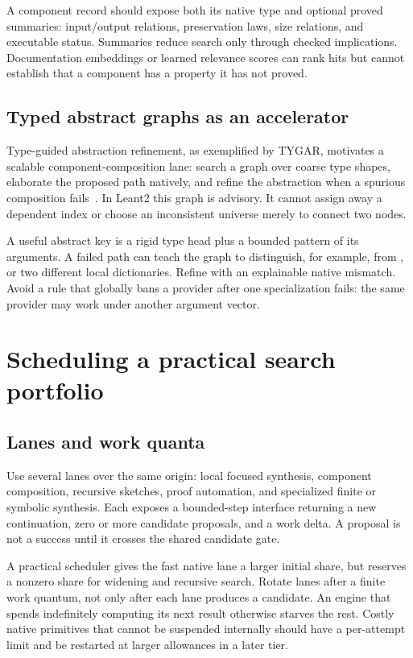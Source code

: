 A component record should expose both its native type and optional proved summaries: input/output relations, preservation laws, size relations, and executable status. Summaries reduce search only through checked implications. Documentation embeddings or learned relevance scores can rank hits but cannot establish that a component has a property it has not proved.

\subsection{Typed abstract graphs as an accelerator}

Type-guided abstraction refinement, as exemplified by TYGAR, motivates a scalable component-composition lane: search a graph over coarse type shapes, elaborate the proposed path natively, and refine the abstraction when a spurious composition fails~\cite{tygar}. In Leant2 this graph is advisory. It cannot assign away a dependent index or choose an inconsistent universe merely to connect two nodes.

A useful abstract key is a rigid type head plus a bounded pattern of its arguments. A failed path can teach the graph to distinguish, for example,  from , or two different local dictionaries. Refine with an explainable native mismatch. Avoid a rule that globally bans a provider after one specialization fails: the same provider may work under another argument vector.

\section{Scheduling a practical search portfolio}
\label{sec:scheduler}

\subsection{Lanes and work quanta}

Use several lanes over the same origin: local focused synthesis, component composition, recursive sketches, proof automation, and specialized finite or symbolic synthesis. Each exposes a bounded-step interface returning a new continuation, zero or more candidate proposals, and a work delta. A proposal is not a success until it crosses the shared candidate gate.

A practical scheduler gives the fast native lane a larger initial share, but reserves a nonzero share for widening and recursive search. Rotate lanes after a finite work quantum, not only after each lane produces a candidate. An engine that spends indefinitely computing its next result otherwise starves the rest. Costly native primitives that cannot be suspended internally should have a per-attempt limit and be restarted at larger allowances in a later tier.

